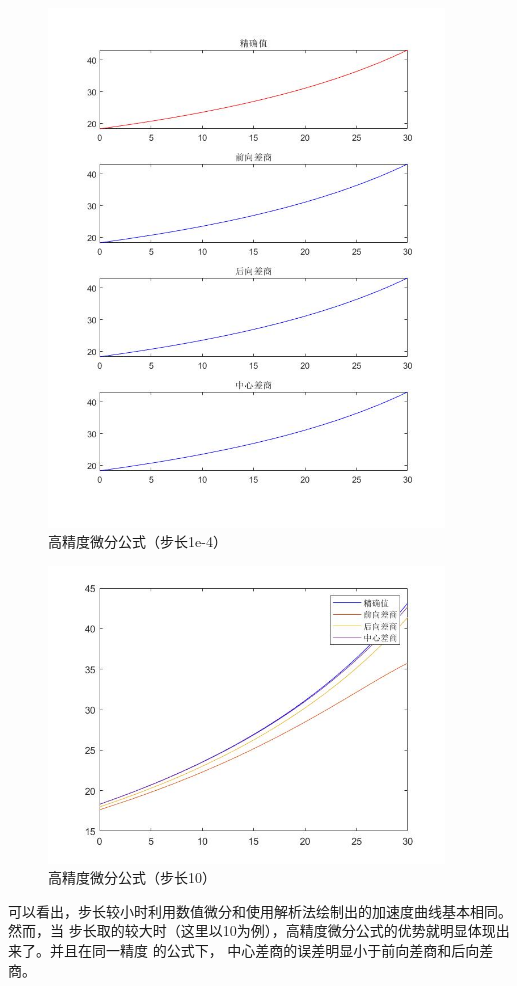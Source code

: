 \documentclass[a4paper,12pt]{ctexart}
\begin{document}
\begin{figure}[H]
    \centering
    \includegraphics[width=10.5cm]{第五章作业/gaojingdu.jpg}
    \caption{高精度微分公式（步长1e-4）}
\end{figure}
\begin{figure}[H]
    \centering
    \includegraphics[width=10.5cm]{第五章作业/gaojingdu10.jpg}
    \caption{高精度微分公式（步长10）}
\end{figure}

\par
可以看出，步长较小时利用数值微分和使用解析法绘制出的加速度曲线基本相同。然而，当
步长取的较大时（这里以10为例），高精度微分公式的优势就明显体现出来了。并且在同一精度
的公式下， 中心差商的误差明显小于前向差商和后向差商。
\end{document}
